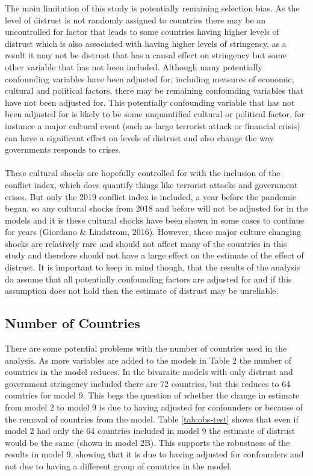 \documentclass[
  11pt,
]{article}
\begin{document}
The main limitation of this study is potentially remaining selection bias. As the level of distrust is not randomly assigned to countries there may be an uncontrolled for factor that leads to some countries having higher levels of distrust which is also associated with having higher levels of stringency, as a result it may not be distrust that has a causal effect on stringency but some other variable that has not been included. Although many potentially confounding variables have been adjusted for, including measures of economic, cultural and political factors, there may be remaining confounding variables that have not been adjusted for. This potentially confounding variable that has not been adjusted for is likely to be some unquantified cultural or political factor, for instance a major cultural event (such as large terrorist attack or financial crisis) can have a significant effect on levels of distrust and also change the way governments responds to crises.\\
~\\
These cultural shocks are hopefully controlled for with the inclusion of the conflict index, which does quantify things like terrorist attacks and government crises. But only the 2019 conflict index is included, a year before the pandemic began, so any cultural shocks from 2018 and before will not be adjusted for in the models and it is these cultural shocks have been shown in some cases to continue for years (Giordano \& Lindstrom, 2016). However, these major culture changing shocks are relatively rare and should not affect many of the countries in this study and therefore should not have a large effect on the estimate of the effect of distrust. It is important to keep in mind though, that the results of the analysis do assume that all potentially confounding factors are adjusted for and if this assumption does not hold then the estimate of distrust may be unreliable.\\

\hypertarget{number-of-countries}{%
\subsection{Number of Countries}\label{number-of-countries}}

There are some potential problems with the number of countries used in the analysis. As more variables are added to the models in Table 2 the number of countries in the model reduces. In the bivaraite models with only distrust and government stringency included there are 72 countries, but this reduces to 64 countries for model 9. This begs the question of whether the change in estimate from model 2 to model 9 is due to having adjusted for confounders or because of the removal of countries from the model. Table \ref{tab:obs-test} shows that even if model 2 had only the 64 countries included in model 9 the estimate of distrust would be the same (shown in model 2B). This supports the robustness of the results in model 9, showing that it is due to having adjusted for confounders and not due to having a different group of countries in the model.\\
\end{document}
